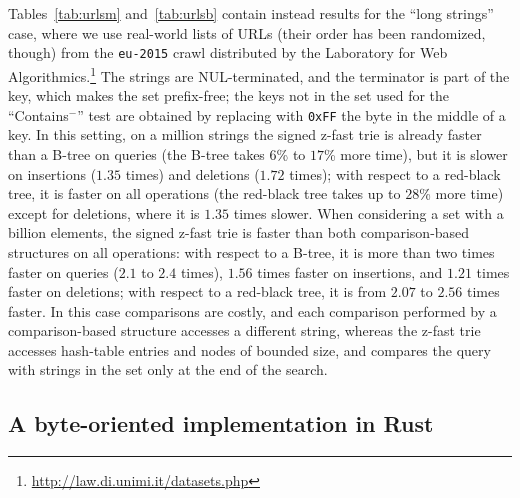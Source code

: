 \documentclass[a4paper]{article}
\newcommand{\?}{\mskip1.5mu}
\begin{document}
Tables~\ref{tab:urlsm} and~\ref{tab:urlsb} contain instead results for the ``long strings'' case, where
we use real-world lists of URLs (their order has been randomized, though) from the \texttt{eu-2015}
crawl distributed by the Laboratory for Web Algorithmics.\footnote{\url{http://law.di.unimi.it/datasets.php}} 
The strings are NUL-terminated, and the terminator is part of the key, which makes the set prefix-free; 
the keys not in the set used for the ``Contains$^-$'' test are obtained by replacing with \texttt{0xFF} the byte in the middle of a key.
In this setting, on a million strings
the signed z-fast trie is already faster than a B-tree on queries (the B-tree takes $6$\% to $17$\% more time), but it is slower on insertions ($1.35$ times) and deletions 
($1.72$ times); with respect to a red-black tree, it is faster on all operations (the red-black tree takes up to $28$\% more time) except for deletions, where it is 
$1.35$ times slower.
When considering a set with a billion elements, the signed z-fast trie is faster than both comparison-based structures on all operations:
with respect to a B-tree, it is more than two times faster on queries ($2.1$ to $2.4$ times), $1.56$ times faster on insertions,
and $1.21$ times faster on deletions; with respect to a red-black tree, it is from $2.07$ to $2.56$ times faster.
In this case comparisons
are costly, and each comparison performed by a comparison-based structure accesses a different string, whereas the z-fast trie 
accesses hash-table entries and nodes of bounded size, and compares the query with strings in the set only at the end of the search. 

\subsection{A byte-oriented implementation in Rust}
\label{sec:rust}

\end{document}
